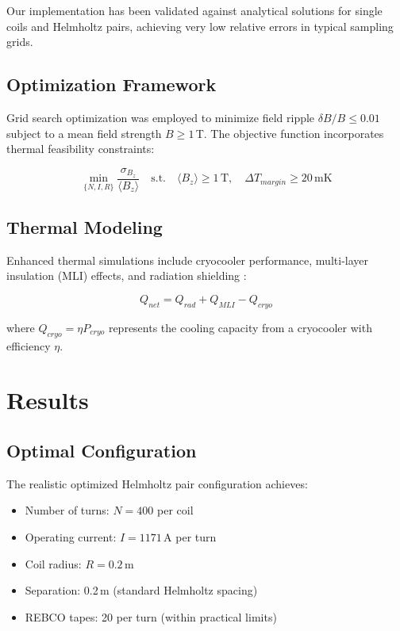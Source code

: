 \documentclass[12pt,a4paper]{article}
\begin{document}
Our implementation has been validated against analytical solutions for single coils and Helmholtz pairs, achieving very low relative errors in typical sampling grids.

\subsection{Optimization Framework}

Grid search optimization was employed to minimize field ripple $\delta B / B \leq 0.01$ subject to a mean field strength $B \geq 1\,$T. The objective function incorporates thermal feasibility constraints:

\begin{equation}
\min_{\{N,I,R\}} \frac{\sigma_{B_z}}{\langle B_z \rangle} \quad \text{s.t.} \quad \langle B_z \rangle \geq 1\,\mathrm{T}, \quad \Delta T_{margin} \geq 20\,\mathrm{mK}
\end{equation}

\subsection{Thermal Modeling}

Enhanced thermal simulations include cryocooler performance, multi-layer insulation (MLI) effects, and radiation shielding \cite{iwasa2022}:

\begin{equation}
Q_{net} = Q_{rad} + Q_{MLI} - Q_{cryo}
\end{equation}

where $Q_{cryo} = \eta P_{cryo}$ represents the cooling capacity from a cryocooler with efficiency $\eta$.

\section{Results}

\subsection{Optimal Configuration}

The realistic optimized Helmholtz pair configuration achieves:
\begin{itemize}
\item Number of turns: $N = 400$ per coil
\item Operating current: $I = 1171\,$A per turn
\item Coil radius: $R = 0.2\,$m
\item Separation: 0.2\,m (standard Helmholtz spacing)
\item REBCO tapes: 20 per turn (within practical limits)
\end{itemize}
\end{document}

